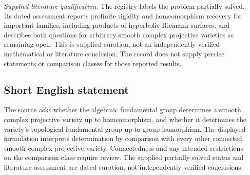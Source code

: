 \documentclass[11pt]{article}
\begin{document}
\textit{Supplied literature qualification.} The registry labels the problem partially solved. Its dated assessment reports profinite rigidity and homeomorphism recovery for important families, including products of hyperbolic Riemann surfaces, and describes both questions for arbitrary smooth complex projective varieties as remaining open. This is supplied curation, not an independently verified mathematical or literature conclusion. The record does not supply precise statements or comparison classes for those reported results.
\subsection{Short English statement}
The source asks whether the algebraic fundamental group determines a smooth complex projective variety up to homeomorphism, and whether it determines the variety's topological fundamental group up to group isomorphism. The displayed formulation interprets determination by comparison with every other connected smooth complex projective variety. Connectedness and any intended restrictions on the comparison class require review. The supplied partially solved status and literature assessment are dated curation, not independently verified conclusions.
\end{document}
